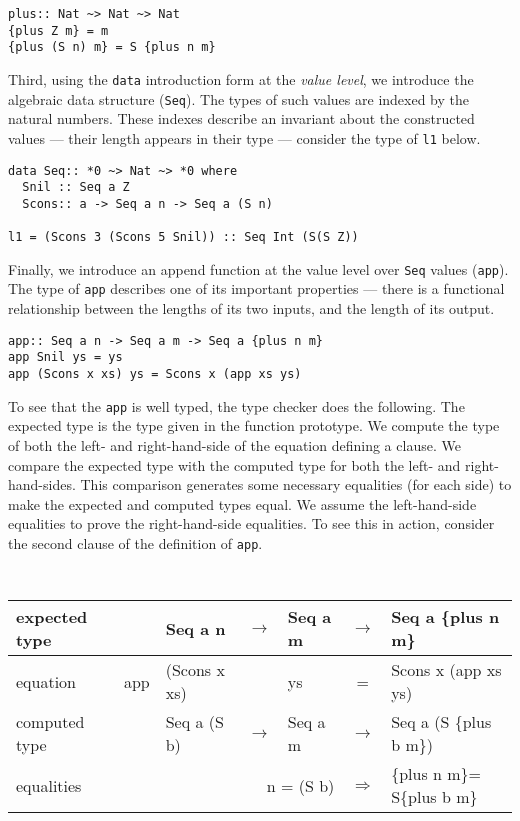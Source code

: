 \documentclass[11pt,twoside,A4]{llncs}
\newcommand{\plus}[2]{\{plus {#1} {#2}\}}
\begin{document}
{\small
\begin{verbatim}
plus:: Nat ~> Nat ~> Nat
{plus Z m} = m
{plus (S n) m} = S {plus n m}
\end{verbatim}}


Third, using the {\tt data} introduction form at the {\em value level}, we introduce
the algebraic data structure ({\tt Seq}). The types of such values are indexed
by the natural numbers.  These indexes describe an invariant about the
constructed values --- their length appears in their type --- consider the type
of {\tt l1} below. 

{\small
\begin{verbatim}
data Seq:: *0 ~> Nat ~> *0 where
  Snil :: Seq a Z
  Scons:: a -> Seq a n -> Seq a (S n)
  
l1 = (Scons 3 (Scons 5 Snil)) :: Seq Int (S(S Z))
\end{verbatim}}

Finally, we introduce an append function at the value level over {\tt Seq}
values ({\tt app}). The type of {\tt app} describes one of its important
properties --- there is a functional relationship between the lengths of its two
inputs, and the length of its output.

{\small
\begin{verbatim}
app:: Seq a n -> Seq a m -> Seq a {plus n m}
app Snil ys = ys
app (Scons x xs) ys = Scons x (app xs ys)
\end{verbatim}}

\noindent
To see that the {\tt app} is well typed, the type checker does the following.
The expected type is the type given in the function prototype. We
compute the type of both the left- and right-hand-side of the equation
defining a clause. We compare the expected type with the computed type
for both the left- and right-hand-sides. This comparison generates
some necessary equalities (for each side) to make the expected and computed
types equal. We assume the left-hand-side
equalities to prove the right-hand-side equalities. To see this in
action, consider the second clause of the definition of \verb+app+.

\vspace*{.1in}
{\tt
\begin{tabular}{|l|rlclcl|} \hline
{\small {\normalfont expected type}} & &{\small{{Seq a n}}} & $\rightarrow$ & {\small{{Seq a m}}} & $\rightarrow$ &  {\small{{Seq a \plus{n}{m}}}}\\ \hline
{\small {\normalfont equation}}      & {\small{app}}&  {\small{{(Scons x xs)}}} & &  {\small{{ys}}} & = & {\small{{Scons x (app xs ys)}}} \\ \hline
{\small {\normalfont computed type}} & & {\small{{Seq a (S b)}}} & $\rightarrow$ & {\small{{Seq a m}}} & $\rightarrow$ & {\small{{Seq a (S \plus{b}{m})}}}  \\ \hline
{\small {\normalfont equalities}}    & & \multicolumn{3}{r}{\small{{n = (S b)}}} & $\Rightarrow$ & {\small{{\plus{n}{m}= S\plus{b}{m}}}} \\ \hline 
\end{tabular}}
\vspace*{.1in}
\end{document}
